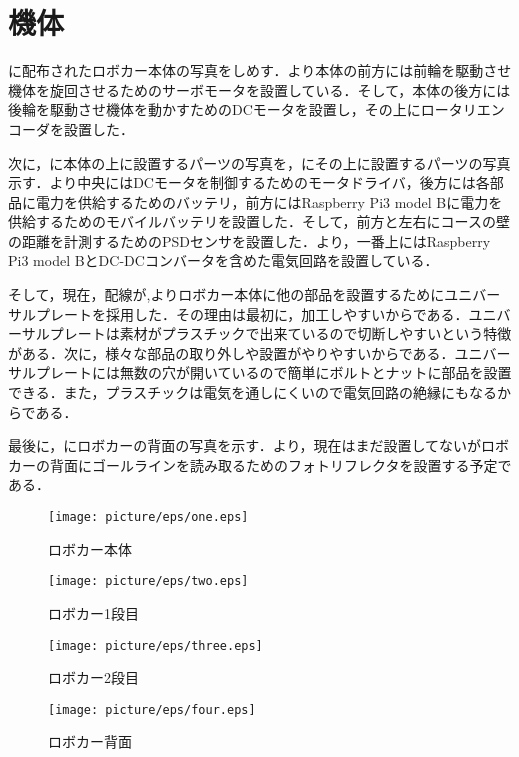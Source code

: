 \section{機体}
に配布されたロボカー本体の写真をしめす．より本体の前方には前輪を駆動させ機体を旋回させるためのサーボモータを設置している．そして，本体の後方には後輪を駆動させ機体を動かすためのDCモータを設置し，その上にロータリエンコーダを設置した．

次に，に本体の上に設置するパーツの写真を，にその上に設置するパーツの写真示す．より中央にはDCモータを制御するためのモータドライバ，後方には各部品に電力を供給するためのバッテリ，前方にはRaspberry Pi3 model Bに電力を供給するためのモバイルバッテリを設置した．そして，前方と左右にコースの壁の距離を計測するためのPSDセンサを設置した．より，一番上にはRaspberry Pi3 model BとDC-DCコンバータを含めた電気回路を設置している．

そして，現在，配線が,よりロボカー本体に他の部品を設置するためにユニバーサルプレートを採用した．その理由は最初に，加工しやすいからである．ユニバーサルプレートは素材がプラスチックで出来ているので切断しやすいという特徴がある．次に，様々な部品の取り外しや設置がやりやすいからである．ユニバーサルプレートには無数の穴が開いているので簡単にボルトとナットに部品を設置できる．また，プラスチックは電気を通しにくいので電気回路の絶縁にもなるからである．

最後に，にロボカーの背面の写真を示す．より，現在はまだ設置してないがロボカーの背面にゴールラインを読み取るためのフォトリフレクタを設置する予定である．

\begin{figure}[htb]
\centering
\texttt{[image: picture/eps/one.eps]}
\caption{ロボカー本体}
\label{fig::first}
\end{figure}

\begin{figure}[htb]
\centering
\texttt{[image: picture/eps/two.eps]}
\caption{ロボカー1段目}
\label{fig::second}
\end{figure}

\begin{figure}[htb]
\centering
\texttt{[image: picture/eps/three.eps]}
\caption{ロボカー2段目}
\label{fig::third}
\end{figure}

\begin{figure}[htb]
\centering
\texttt{[image: picture/eps/four.eps]}
\caption{ロボカー背面}
\label{fig::forth}
\end{figure}
